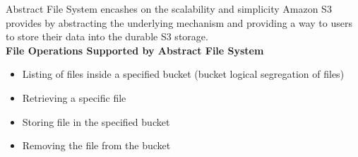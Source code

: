 Abstract File System encashes on the scalability and simplicity Amazon S3
provides by abstracting the underlying mechanism and providing a way to users
to store their data into the durable S3 storage.\\


\textbf{File Operations Supported by Abstract File System}
\\

\begin{itemize}
    \item   Listing of files inside a specified bucket (bucket logical
segregation of files)
    \item       Retrieving a specific file
    \item       Storing file in  the specified bucket
    \item       Removing the file from the bucket
\end{itemize}


